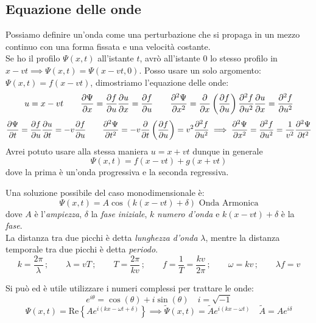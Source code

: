 \documentclass[12pt,a4paper]{article}
\begin{document}
\subsection{Equazione delle onde}
Possiamo definire un'onda come una perturbazione che si propaga in un mezzo continuo con una forma fissata e una velocità costante.
\\ Se ho il profilo $\Psi(x,t)$ all'istante $t$, avrò all'istante $0$ lo stesso profilo in $x-vt \implies \Psi(x,t)= \Psi(x-vt,0)$.
Posso usare un solo argomento: $\Psi(x,t)= f(x-vt)$, dimostriamo l'equazione delle onde:
\begin{equation*}
    u= x-vt\qquad\pdv{\Psi}{x}= \pdv{f}{u}\pdv{u}{x}= \pdv{f}{u}\qquad\pdv[2]{\Psi}{x}= \pdv{}{x}\left( \pdv{f}{u} \right)\pdv[2]{f}{u}\pdv{u}{x}=\pdv[2]{f}{u}
\end{equation*}
\begin{equation*}
    \pdv{\Psi}{t}= \pdv{f}{u}\pdv{u}{t}= -v\pdv{f}{u}\qquad\pdv[2]{\Psi}{t}= -v\pdv{}{t}\left( \pdv{f}{u} \right)= v^2\pdv[2]{f}{u}\implies \pdv[2]{\Psi}{x}= \pdv[2]{f}{u}= \frac{1}{v^2}\pdv[2]{\Psi}{t}
\end{equation*}
Avrei potuto usare alla stessa maniera $u = x+vt$ dunque in generale\[\Psi(x,t)= f(x-vt)+g(x+vt)\]
dove la prima è un'onda progressiva e la seconda regressiva.


Una soluzione possibile del caso monodimensionale è:
\begin{equation*}
    \Psi(x,t)= A\cos(k(x-vt)+\delta) \text{  Onda Armonica}
\end{equation*}
dove $A$ è l'\textit{ampiezza}, $\delta$ la \textit{fase iniziale}, $k$ \textit{numero d'onda} e $k(x-vt)+\delta$ è la \textit{fase}.
\\La distanza tra due picchi è detta \textit{lunghezza d'onda} $\lambda$, mentre
la distanza temporale tra due picchi è detta \textit{periodo}.
\begin{equation*}
    k= \frac{2\pi}{\lambda}\,;\qquad \lambda= vT\,;\qquad T=\frac{2\pi}{kv}\,;\qquad f = \frac{1}{T}= \frac{kv}{2\pi}\,;
    \qquad \omega= kv\,;\qquad\lambda f= v 
\end{equation*}

Si può ed è utile utilizzare i numeri complessi per trattare le onde:
\begin{equation*}
    e^{ i\theta }= \cos(\theta)+ i\sin(\theta) \quad i = \sqrt{-1}
\end{equation*}
\begin{equation*}
    \Psi(x,t) = \mathrm{Re}\left\{ A e^{ i\left( kx-\omega t +\delta \right) } \right\}\implies \tilde{\Psi}(x,t) = \tilde{A} e^{ i\left( kx-\omega t \right) }\quad \tilde{A}= Ae^{i\delta}
\end{equation*}
\end{document}
